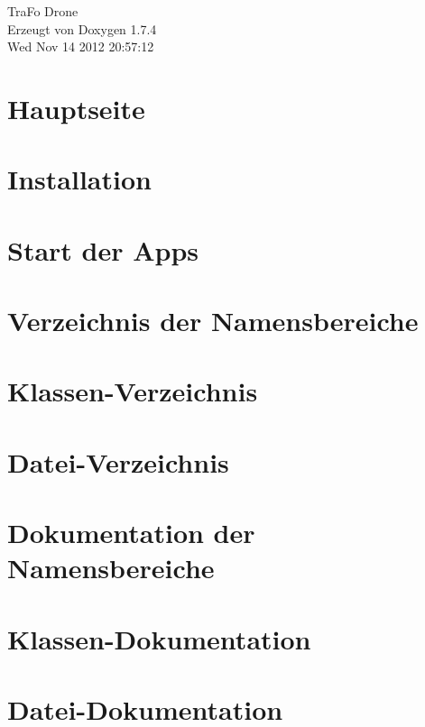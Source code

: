 \documentclass[a4paper]{book}
\begin{document}
\hypersetup{pageanchor=false}
\begin{titlepage}
\vspace*{7cm}
\begin{center}
{\Large TraFo Drone }\\
\vspace*{1cm}
{\large Erzeugt von Doxygen 1.7.4}\\
\vspace*{0.5cm}
{\small Wed Nov 14 2012 20:57:12}\\
\end{center}
\end{titlepage}
\clearemptydoublepage
{}
\tableofcontents
\clearemptydoublepage
{}
\hypersetup{pageanchor=true}
\chapter{Hauptseite}
\label{index}\hypertarget{index}{}
\chapter{Installation}
\label{page1}
\hypertarget{page1}{}

\chapter{Start der Apps}
\label{page2}
\hypertarget{page2}{}

\chapter{Verzeichnis der Namensbereiche}

\chapter{Klassen-\/Verzeichnis}

\chapter{Datei-\/Verzeichnis}

\chapter{Dokumentation der Namensbereiche}



\chapter{Klassen-\/Dokumentation}


\chapter{Datei-\/Dokumentation}
















\printindex
\end{document}
